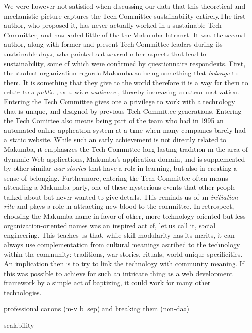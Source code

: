 \documentclass{acm_proc_article-sp}
\begin{document}
We were however not satisfied when discussing our data that this theoretical and mechanistic picture captures the Tech Committee sustainability entirely.The first author, who proposed it, has never actually worked in a sustainable Tech Committee, and has coded little of the the Makumba Intranet. It was the second author, along with former and present Tech Committee leaders during its sustainable days, who pointed out  several other aspects that lead to sustainability, some of which were confirmed by questionnaire respondents. First, the student organization regards Makumba as being something that \textit{belongs} to them. It is something that they give to the world therefore it is a way for them to relate to a \textit{public} \cite{stebbins79}, or a wide \textit{audience} \cite{bogdan03}, thereby increasing amateur motivation. Entering the Tech Committee gives one a privilege to work with a technology that is unique, and designed by previous Tech Committee generations. Entering the Tech Comittee also means being part of the team who had in 1995 an automated online application system at a time when many companies barely had a static website. While such an early achievement is not directly related to Makumba, it emphasizes the Tech Committee long-lasting tradition in the area of dynamic Web applications, Makumba's application domain, and is supplemented by other similar \textit{war stories} \cite{orr96} that have a role in learning, but also in creating a sense of belonging. Furthermore, entering the Tech Committee often means attending a Makumba party, one of these mysterious events that other people talked about but never wanted to give details. This reminds us of an \textit{initiation rite}\cite{vanGennep60} and plays a role in attracting new blood to the committee. In retrospect, choosing the Makumba name in favor of other, more technology-oriented but less organization-oriented names was an inspired act of, let us call it, social engineering. This teaches us that, while skill modularity has its merits, it can always use complementation from cultural meanings ascribed to the technology within the community: traditions, war stories, rituals, world-unique specificities. An implication then is to try to link the technology with community meaning. If this was possible to achieve for such an intricate thing as a web development framework by a simple act of baptizing, it could work for many other technologies.

professional canons (m-v bl sep) and breaking them (non-dao)

scalability
\end{document}
